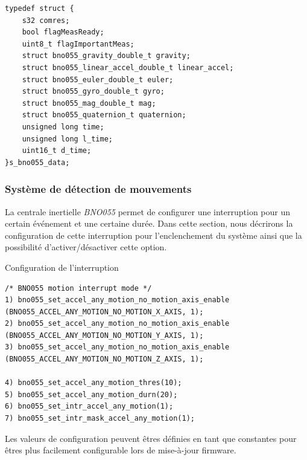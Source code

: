 \begin{verbatim}
typedef struct {
	s32 comres;
	bool flagMeasReady;
	uint8_t flagImportantMeas;
	struct bno055_gravity_double_t gravity;
	struct bno055_linear_accel_double_t linear_accel;
	struct bno055_euler_double_t euler;
	struct bno055_gyro_double_t gyro;
	struct bno055_mag_double_t mag;
	struct bno055_quaternion_t quaternion;
	unsigned long time;
	unsigned long l_time;
	uint16_t d_time;
}s_bno055_data;
\end{verbatim}

\subsubsection{Système de détection de mouvements}

La centrale inertielle \textit{BNO055} permet de configurer une interruption pour un certain événement et une certaine durée. Dans cette section, nous décrirons la configuration de cette interruption pour l'enclenchement du système ainsi que la possibilité d'activer/désactiver cette option.

\begin{code}
\caption{Configuration de l'interruption}
\label{code:configInt}
\vspace*{-3mm}
\begin{verbatim}
/* BNO055 motion interrupt mode */
1) bno055_set_accel_any_motion_no_motion_axis_enable (BNO055_ACCEL_ANY_MOTION_NO_MOTION_X_AXIS, 1);
2) bno055_set_accel_any_motion_no_motion_axis_enable (BNO055_ACCEL_ANY_MOTION_NO_MOTION_Y_AXIS, 1);
3) bno055_set_accel_any_motion_no_motion_axis_enable (BNO055_ACCEL_ANY_MOTION_NO_MOTION_Z_AXIS, 1);

4) bno055_set_accel_any_motion_thres(10);
5) bno055_set_accel_any_motion_durn(20);
6) bno055_set_intr_accel_any_motion(1);
7) bno055_set_intr_mask_accel_any_motion(1);	
\end{verbatim}
\end{code}

Les valeurs de configuration peuvent êtres définies en tant que constantes pour êtres plus facilement configurable lors de mise-à-jour firmware.

